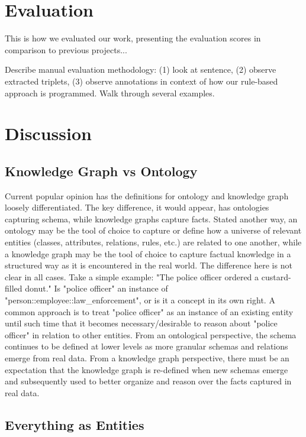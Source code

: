\documentclass[11pt,letterpaper]{article}
\begin{document}
\section{Evaluation}

This is how we evaluated our work, presenting the evaluation scores in comparison to previous projects...

Describe manual evaluation methodology: (1) look at sentence, (2) observe extracted triplets, (3) observe annotations in context of how our rule-based approach is programmed.  Walk through several examples.



\section{Discussion}

\subsection{Knowledge Graph vs Ontology}\label{ont_vs_kg}

Current popular opinion \cite{science_where_2018, schrader_whats_2020} has the definitions for ontology and knowledge graph loosely differentiated.  The key difference, it would appear, has ontologies capturing schema, while knowledge graphs capture facts.  Stated another way, an ontology may be the tool of choice to capture or define how a universe of relevant entities (classes, attributes, relations, rules, etc.) are related to one another, while a knowledge graph may be the tool of choice to capture factual knowledge in a structured way as it is encountered in the real world.  The difference here is not clear in all cases.  Take a simple example: "The police officer ordered a custard-filled donut."  Is "police officer" an instance of "person::employee::law\_enforcement", or is it a concept in its own right.  A common approach is to treat "police officer" as an instance of an existing entity until such time that it becomes necessary/desirable to reason about "police officer" in relation to other entities.  From an ontological perspective, the schema continues to be defined at lower levels as more granular schemas and relations emerge from real data.  From a knowledge graph perspective, there must be an expectation that the knowledge graph is re-defined when new schemas emerge and subsequently used to better organize and reason over the facts captured in real data.


\subsection{Everything as Entities}
\end{document}

